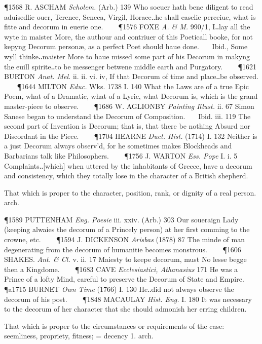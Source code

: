 \begin{description}[wide, labelwidth=!, labelindent=0pt]
\begin{myenumerate}
\P 1568 R. ASCHAM  \textit{Scholem.} (Arb.) 139 Who soeuer hath bene diligent to read aduisedlie ouer, Terence, Seneca, Virgil, Horace‥he shall easelie perceiue, what is fitte and decorum in euerie one.    
\P 1576 FOXE  \textit{A. \& M.} 990/1, I‥lay all the wyte in maister More, the authour and contriuer of this Poeticall booke, for not kepyng Decorum personæ, as a perfect Poet should haue done.    Ibid., Some wyll thinke‥maister More to haue missed some part of his Decorum in makyng the euill spirite‥to be messenger betwene middle earth and Purgatory.    
\P 1621 BURTON  \textit{Anat. Mel.} ii. ii. vi. iv, If that Decorum of time and place‥be observed.    
\P 1644 MILTON \textit{Educ.} Wks. 1738 I. 140  What the Laws are of a true Epic Poem, what of a Dramatic, what of a Lyric, what Decorum is, which is the grand master-piece to observe.    
\P 1686 W. AGLIONBY  \textit{Painting Illust.} ii. 67 Simon Sanese began to understand the Decorum of Composition.    Ibid. iii. 119 The second part of Invention is Decorum; that is, that there be nothing Absurd nor Discordant in the Piece.    
\P 1704 HEARNE  \textit{Duct. Hist.} (1714) I. 132 Neither is a just Decorum always observ'd, for he sometimes makes Blockheads and Barbarians talk like Philosophers.    
\P 1756 J. WARTON  \textit{Ess. Pope} I. i. 5 Complaints‥[which] when uttered by the inhabitants of Greece, have a decorum and consistency, which they totally lose in the character of a British shepherd.

 That which is proper to the character, position, rank, or dignity of a real person. arch.

\P 1589 PUTTENHAM  \textit{Eng. Poesie} iii. xxiv. (Arb.) 303 Our soueraign Lady (keeping alwaies the decorum of a Princely person) at her first comming to the crowne, etc.    
\P 1594 J. DICKENSON  \textit{Arisbas} (1878) 87 The minde of man degenerating from the decorum of humanitie becomes monstrous.    
\P 1606 SHAKES.  \textit{Ant. \& Cl.} v. ii. 17 Maiesty to keepe decorum, must No lesse begge then a Kingdome.    
\P 1683 CAVE  \textit{Ecclesiastici, Athanasius} 171 He was a Prince of a lofty Mind, careful to preserve the Decorum of State and Empire.
\P a1715 BURNET  \textit{Own Time} (1766) I. 130 He‥did not always observe the decorum of his post.    
\P 1848 MACAULAY  \textit{Hist. Eng.} I. 180 It was necessary to the decorum of her character that she should admonish her erring children.

 That which is proper to the circumstances or requirements of the case: seemliness, propriety, fitness; = decency 1. arch.


\end{myenumerate}
\end{description}
